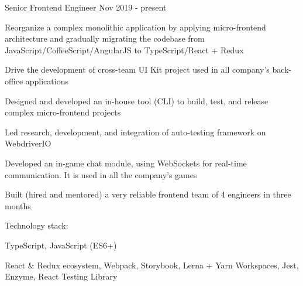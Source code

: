 \begin{cventries}
  \cventry
    {Senior Frontend Engineer} %
    {} %
    {} %
    {Nov 2019 - present} %
    {
      \begin{cvitems} 
        \item Reorganize a complex monolithic application by applying micro-frontend architecture and gradually migrating the codebase from JavaScript/CoffeeScript/AngularJS to TypeScript/React + Redux
        \item Drive the development of cross-team UI Kit project used in all company's back-office applications
        \item Designed and developed an in-house tool (CLI) to build, test, and release complex micro-frontend projects
        \item Led research, development, and integration of auto-testing framework on WebdriverIO
        \item Developed an in-game chat module, using WebSockets for real-time communication. It is used in all the company's games
        \item Built (hired and mentored) a very reliable frontend team of 4 engineers in three months
      \end{cvitems}
      \vspace{5mm}
      Technology stack:
      \begin{cvstackitems}
        \item TypeScript, JavaScript (ES6+)
        \item React \& Redux ecosystem, Webpack, Storybook, Lerna + Yarn Workspaces, Jest, Enzyme, React Testing Library
      \end{cvstackitems}
      \vspace{-2.0mm}
    }


\end{cventries}
